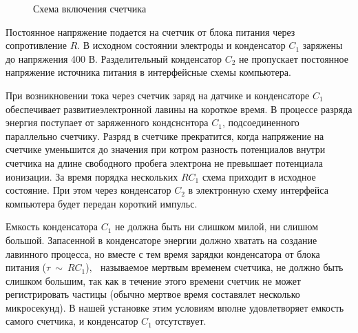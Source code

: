 \documentclass[14pt]{article}
\begin{document}
\begin{figure}[h!]
	\caption{Схема включения счетчика}
	\label{fig:image}
\end{figure}

Постоянное напряжение подается на счетчик от блока питания через сопротивление $R$. В исходном состоянии электроды и конденсатор $C_1$ заряжены до напряжения 400 В. Разделительный конденсатор $C_2$ не пропускает постоянное напряжение источника питания в интерфейсные схемы компьютера.

При возникновении тока через счетчик заряд на датчике и конденсаторе $C_1$ обеспечивает развитиеэлектронной лавины на короткое время. В процессе разряда энергия поступает от заряженного кондснснтора $C_1$, подсоединенного параллельно счетчику. Разряд в счетчике прекратится, когда напряжение на счетчике уменьшится до значения при котром разность потенциалов внутри счетчика на длине свободного пробега электрона не превышает потенциала ионизации. За время порядка нескольких $RC_1$ схема приходит в исходное состояние. При этом через конденсатор $C_2$ в электронную схему интерфейса компьютера будет передан короткий импульс.

Емкость конденсатора $C_1$ не должна быть ни слишком милой, ни слишюм большой. Запасенной в конденсаторе энергии должно хватать на создание лавинного процесса, но вместе с тем время зарядки конденсатора от блока питания ($\tau~\sim~RC_1$)‚ $~$ называемое мертвым временем счетчика, не должно быть слишком большим, так как в течение этого времени счетчик не может регистрировать частицы (обычно мертвое время составялет несколько микросекунд). В нашей установке этим условиям вполне удовлетворяет емкость самого счетчика, и конденсатор $C_1$ отсутствует.
\end{document}
